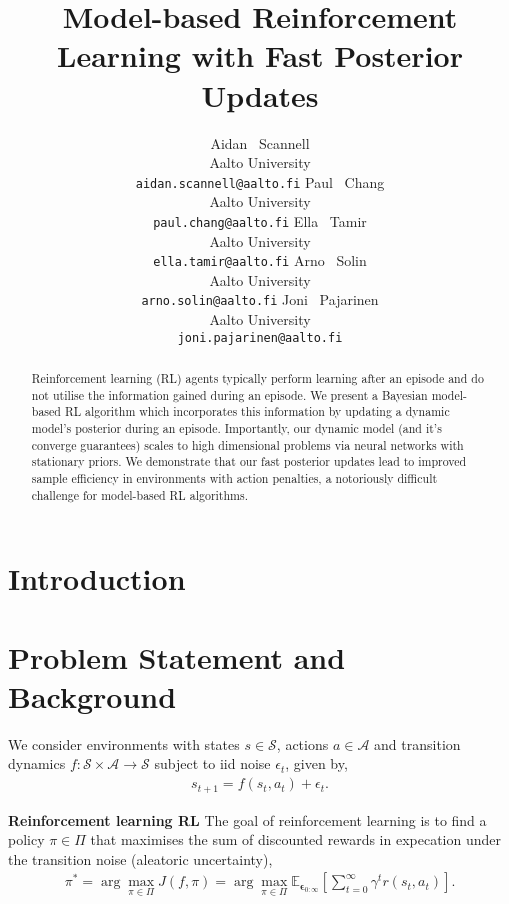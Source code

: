 \documentclass{article}
\title{Model-based Reinforcement Learning with Fast Posterior Updates}
\author{%
  Aidan ~Scannell \\
  Aalto University\\
  \texttt{aidan.scannell@aalto.fi}
  \And
  Paul ~Chang \\
  Aalto University\\
  \texttt{paul.chang@aalto.fi}
  \And
  Ella ~Tamir \\
  Aalto University\\
  \texttt{ella.tamir@aalto.fi}
  \And
  Arno ~Solin \\
  Aalto University\\
  \texttt{arno.solin@aalto.fi}
  \And
  Joni ~Pajarinen \\
  Aalto University\\
  \texttt{joni.pajarinen@aalto.fi}
}
\begin{document}
\maketitle

\begin{abstract}
  Reinforcement learning (RL) agents typically perform learning after an episode and do not utilise the information gained during an episode.
  We present a Bayesian model-based RL algorithm which incorporates this information by updating a dynamic model's posterior during an episode.
  Importantly, our dynamic model (and it's converge guarantees) scales to high dimensional problems via neural networks with stationary priors.
  We demonstrate that our fast posterior updates lead to improved sample efficiency in environments with action penalties, a notoriously difficult
  challenge for model-based RL algorithms.

\end{abstract}

\section{Introduction} \label{sec:intro}

\section{Problem Statement and Background} \label{sec:problem-statement}
We consider environments with states \(s \in \mathcal{S}\), actions \(a \in \mathcal{A}\) and transition dynamics \(f: \mathcal{S} \times \mathcal{A} \rightarrow \mathcal{S}\) subject to
iid noise \(\epsilon_{t}\), given by,
\begin{align}
s_{t+1} = f(s_{t}, a_{t}) + \epsilon_{t}.
\end{align}

\textbf{Reinforcement learning RL}
The goal of reinforcement learning is to find a policy \(\pi \in \Pi\) that maximises the sum of discounted
rewards in expecation under the transition noise (aleatoric uncertainty),
\begin{align} \label{eq-model-free-objective}
\pi^{*} = \arg \max_{\pi \in \Pi} J(f, \pi) = \arg \max_{\pi \in \Pi} \mathbb{E}_{\bm\epsilon_{0:\infty}} \left[ \sum_{t=0}^{\infty} \gamma^{t} r(s_{t},a_{t}) \right].
\end{align}
\end{document}
